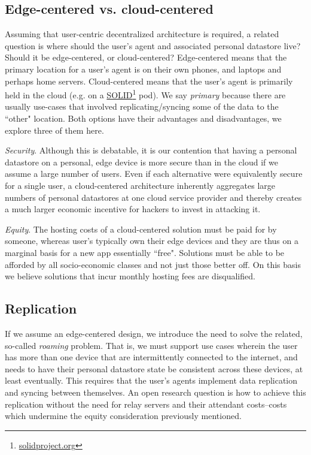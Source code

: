 \documentclass[11pt, oneside]{article}   	%
\newcommand{\hyperfootnote}[1][]{\def\ArgI{{#1}}\hyperfootnoteRelay}
\newcommand\hyperfootnoteRelay[2][]{\href{#1#2}{\ArgI}\footnote{\href{#1#2}{#2}}}
\begin{document}
\subsection{Edge-centered vs. cloud-centered}
Assuming that user-centric decentralized architecture is required, a related question is where should the user's agent and associated personal datastore live? Should it be edge-centered, or cloud-centered? Edge-centered means that the primary location for a user's agent is on their own phones, and laptops and perhaps home servers. Cloud-centered means that the user's agent is primarily held in the cloud (e.g. on a \hyperfootnote[SOLID][https://]{solidproject.org} pod). We say \emph{primary} because there are usually use-cases that involved replicating/syncing some of the data to the ``other" location. Both options have their advantages and disadvantages, we explore three of them here.

\emph{Security}. Although this is debatable, it is our contention that having a personal datastore on a personal, edge device is more secure than in the cloud if we assume a large number of users. Even if each  alternative were equivalently secure for a single user, a cloud-centered architecture inherently aggregates large numbers of personal datastores at one cloud service provider and thereby creates a much larger economic incentive for hackers to invest in attacking it. 

\emph{Equity}. The hosting costs of a cloud-centered solution must be paid for by someone, whereas user's typically own their edge devices and they are thus on a marginal basis for a new app essentially ``free". Solutions must be able to be afforded by all socio-economic classes and not just those better off. On this basis we believe solutions that incur monthly hosting fees are disqualified.

\subsection{Replication}

If we assume an edge-centered design, we introduce the need to solve the related, so-called \emph{roaming} problem. That is, we must support use cases wherein the user has more than one device that are intermittently connected to the internet, and needs to have their personal datastore state be consistent across these devices, at least eventually. This requires that the user's agents implement data replication and syncing between themselves. An open research question is how to achieve this replication without the need for relay servers and their attendant costs--costs which undermine the equity consideration previously mentioned.
\end{document}
